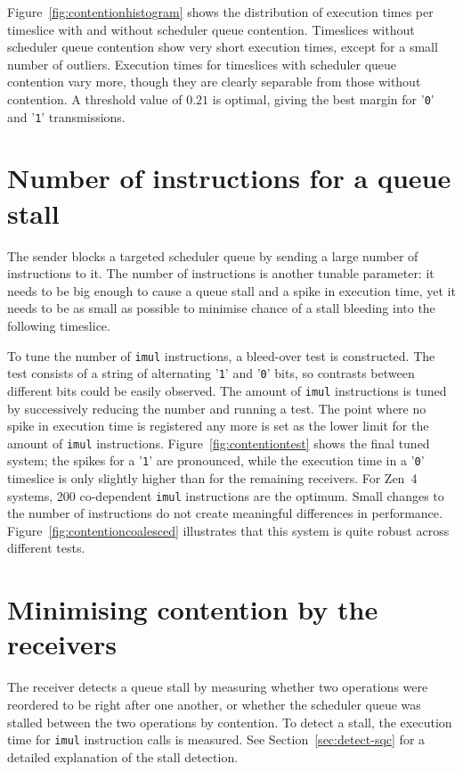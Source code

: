 \documentclass[11pt,
  titlepage=false,
  parskip=half,      %
]{scrreprt}
\begin{document}
Figure~\ref{fig:contentionhistogram} shows the distribution of execution times per timeslice with and without scheduler queue contention.
Timeslices without scheduler queue contention show very short execution times, except for a small number of outliers.
Execution times for timeslices with scheduler queue contention vary more, though they are clearly separable from those without contention.
A threshold value of $0.21$ is optimal, giving the best margin for '\texttt{0}' and '\texttt{1}' transmissions.


\section{Number of instructions for a queue stall}
The sender blocks a targeted scheduler queue by sending a large number of instructions to it.
The number of instructions is another tunable parameter:
it needs to be big enough to cause a queue stall and a spike in execution time,
yet it needs to be as small as possible to minimise chance of a stall bleeding into the following timeslice.

To tune the number of \texttt{imul} instructions, a bleed-over test is constructed.
The test consists of a string of alternating '\texttt{1}' and '\texttt{0}' bits, so contrasts between different bits could be easily observed.
The amount of \texttt{imul} instructions is tuned by successively reducing the number and running a test.
The point where no spike in execution time is registered any more is set as the lower limit for the amount of \texttt{imul} instructions.
Figure~\ref{fig:contentiontest} shows the final tuned system;
the spikes for a '\texttt{1}' are pronounced, while the execution time in a '\texttt{0}' timeslice is only slightly higher than for the remaining receivers.
For Zen~4 systems, 200 co-dependent \texttt{imul} instructions are the optimum.
Small changes to the number of instructions do not create meaningful differences in performance.
Figure~\ref{fig:contentioncoalesced} illustrates that this system is quite robust across different tests.

\section{Minimising contention by the receivers}
\label{sec:reducecontention}
The receiver detects a queue stall by measuring whether two operations were reordered to be right after one another,
or whether the scheduler queue was stalled between the two operations by contention.
To detect a stall, the execution time for \texttt{imul} instruction calls is measured.
See Section~\ref{sec:detect-sqc} for a detailed explanation of the stall detection.
\end{document}

